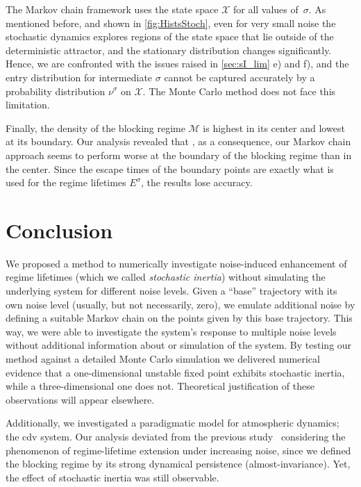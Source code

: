 The Markov chain framework uses the state space $\mathcal{X}$ for all values of~$\sigma$. As mentioned before, and shown in \cref{fig:HistsStoch}, even for very small noise the stochastic dynamics explores regions of the state space that lie outside of the deterministic attractor, and the stationary distribution changes significantly. Hence, we are confronted with the issues raised in \cref{sec:sI_lim} e) and f), and the entry distribution for intermediate $\sigma$ cannot be captured accurately by a probability distribution $\nu^\sigma $ on $\mathcal{X}$. The Monte Carlo method does not face this limitation.

Finally, the density of the blocking regime $\mathcal{M}$ is highest in its center and lowest at its boundary. Our analysis revealed that , as a consequence, our Markov chain approach seems to perform worse at the boundary of the blocking regime than in the center. Since the escape times of the boundary points are exactly what is used for the regime lifetimes $E^\sigma$, the results lose accuracy.

\section{Conclusion}\label{sec:sI_fin}

We proposed a method to numerically investigate noise-induced enhancement of regime lifetimes (which we called \emph{stochastic inertia}) without simulating the underlying system for different noise levels. Given a \enquote{base} trajectory with its own noise level (usually, but not necessarily, zero), we emulate additional noise by defining a suitable Markov chain on the points given by this base trajectory. This way, we were able to investigate the system's response to multiple noise levels without additional information about or simulation of the system. By testing our method against a detailed Monte Carlo simulation we delivered numerical evidence that a one-dimensional unstable fixed point exhibits stochastic inertia, while a three-dimensional one does not. Theoretical justification of these observations will appear elsewhere.

Additionally, we investigated a paradigmatic model for atmospheric dynamics; the \gls{cdv} system. Our analysis deviated from the previous study~\parencite{dorringtonInteractionStochasticForcing2023} considering the phenomenon of regime-lifetime extension under increasing noise, since we defined the blocking regime by its strong dynamical persistence (almost-invariance). Yet, the effect of stochastic inertia was still observable.

